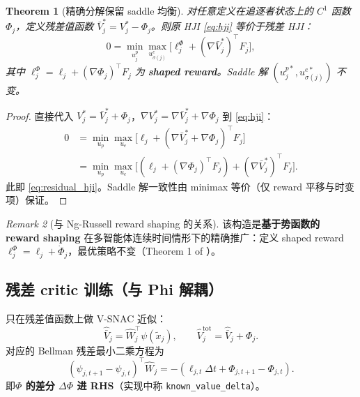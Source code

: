 \documentclass[11pt,a4paper]{article}
\newtheorem{theorem}{Theorem}
\theoremstyle{remark}
\newtheorem{remark}[theorem]{Remark}
\begin{document}
\begin{theorem}[精确分解保留 saddle 均衡]\label{thm:decomp_saddle}
对任意定义在追逐者状态上的 $C^1$ 函数 $\Phi_j$，定义残差值函数 $\bar V_j^*=V_j^*-\Phi_j$。则原 HJI \eqref{eq:hji} 等价于残差 HJI：
\begin{equation}
0=\min_{u_j^p}\max_{u_{\sigma(j)}^e}\Big[\ell_j^\Phi+(\nabla\bar V_j^*)^\top F_j\Big],
\label{eq:residual_hji}
\end{equation}
其中 $\ell_j^\Phi=\ell_j+(\nabla\Phi_j)^\top F_j$ 为 \textbf{shaped reward}。Saddle 解 $(u_j^{p*},u_{\sigma(j)}^{e*})$ 不变。
\end{theorem}

\begin{proof}
直接代入 $V_j^*=\bar V_j^*+\Phi_j$，$\nabla V_j^*=\nabla\bar V_j^*+\nabla\Phi_j$ 到 \eqref{eq:hji}：
\begin{align*}
0&=\min_{u_p}\max_{u_e}\big[\ell_j+(\nabla\bar V_j^*+\nabla\Phi_j)^\top F_j\big]\\
&=\min_{u_p}\max_{u_e}\big[(\ell_j+(\nabla\Phi_j)^\top F_j)+(\nabla\bar V_j^*)^\top F_j\big].
\end{align*}
此即 \eqref{eq:residual_hji}。Saddle 解一致性由 minimax 等价（仅 reward 平移与时变项）保证。
\end{proof}

\begin{remark}[与 Ng-Russell reward shaping 的关系]
该构造是\textbf{基于势函数的 reward shaping} \cite{ng1999policy} 在多智能体连续时间情形下的精确推广：定义 shaped reward $\ell_j^\Phi=\ell_j+\dot\Phi_j$，最优策略不变（Theorem 1 of \cite{ng1999policy}）。
\end{remark}

\subsection{残差 critic 训练（与 Phi 解耦）}

只在残差值函数上做 V-SNAC 近似：
\begin{equation}
\hat{\bar V}_j=\hat W_j^\top\psi(\tilde x_j),\qquad
\hat V_j^{\text{tot}}=\hat{\bar V}_j+\Phi_j.
\label{eq:residual_critic}
\end{equation}
对应的 Bellman 残差最小二乘方程为
\begin{equation}
(\psi_{j,t+1}-\psi_{j,t})^\top\hat W_j = -(\ell_{j,t}\Delta t+\Phi_{j,t+1}-\Phi_{j,t}).
\label{eq:bellman_with_phi}
\end{equation}
即\textbf{$\Phi$ 的差分 $\Delta\Phi$ 进 RHS}（实现中称 \texttt{known\_value\_delta}）。
\end{document}
